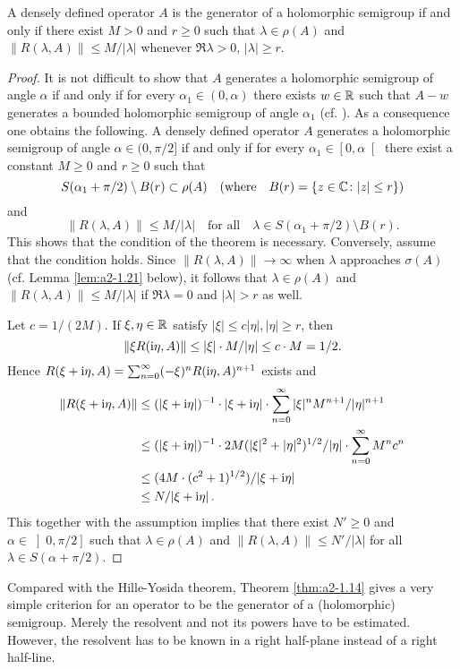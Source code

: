 \begin{theorem}\label{thm:a2-1.14}
A densely defined operator $A$ is the generator of a holomorphic semigroup if and only if there exist $M > 0$ and $r \geq 0$ such that $\lambda \in \rho(A)$ and $\|R(\lambda,A)\| \leq M/|\lambda|$ whenever $\Re\lambda > 0$, $|\lambda| \geq r$.
\end{theorem}
\begin{proof}
It is not difficult to show that $A$ generates a holomorphic semigroup of angle $\alpha$ if and only if for every $\alpha_{1} \in (0,\alpha)$ there exists 
$w \in \mathbb{R}$ such that $A - w$ generates a bounded holomorphic semigroup of angle 
$\alpha_{1}$ (cf. \citet[p.252]{reedsimon:1978}).
As a consequence one obtains the following.
A densely defined operator $A$ generates a holomorphic semigroup of angle $\alpha \in (0,\pi/2]$ if and only if for every $\alpha_{1} \in \left[0,\alpha\right[$ there exist a constant $M \geq 0$ and $r \geq 0$ such that 
\[
S(\alpha_{1} + \pi/2) \setminus B(r) \subset \rho(A) \quad (\text{where} \quad B(r) = \{z \in \mathbb{C} \colon |z| \leq r\})
\]
and
\[
\|R(\lambda,A)\| \leq M/|\lambda|  \quad \text{for all}  \quad \lambda \in S(\alpha_{1}+\pi/2) \setminus B(r).
\]
This shows that the condition of the theorem is necessary.
Conversely, assume that the condition holds.
Since $\|R(\lambda,A)\| \to \infty$ when $\lambda$ approaches $\sigma(A)$ (cf. Lemma  \ref{lem:a2-1.21}   below), 
it follows that $\lambda \in \rho(A)$ and $\|R(\lambda,A)\| \leq M/|\lambda|$ if $\Re\lambda = 0$ and $|\lambda| > r$ as well.

Let $c = 1/(2M)$.
If $\xi, \eta \in \mathbb{R}$ satisfy 
$|\xi| \leq c|\eta|, |\eta| \geq r$, 
then 
\[
\|\xi R(\mathrm{i}\eta,A)\| \leq |\xi| \cdot M/|\eta| \leq c \cdot M = 1/2.
\]
Hence $R(\xi+\mathrm{i}\eta,A) = \sum_{n=0}^\infty (-\xi)^{n}R(\mathrm{i}\eta,A)^{n+1}$ exists and 
\begin{align*}
    \|R(\xi+\mathrm{i}\eta,A)\| &\leq 
    (|\xi + \mathrm{i}\eta|)^{-1} \cdot |\xi + \mathrm{i}\eta| \cdot \sum_{n=0}^\infty |\xi|^{n}M^{n+1}/|\eta|^{n+1}\\
    &\leq  (|\xi + \mathrm{i}\eta|)^{-1} \cdot 2M (|\xi|^{2} + |\eta|^{2})^{1/2} / |\eta| \cdot \sum_{n=0}^\infty M^{n}c^{n}\\   
    &\leq  (4M\cdot(c^{2}+1)^{1/2})/|\xi+\mathrm{i}\eta| \\
    &\leq N/|\xi+\mathrm{i}\eta| \, . 
\end{align*}
This together with the assumption implies that there exist $N' \geq 0$ and $\alpha \in \left]0,\pi/2\right]$ such that $\lambda \in \rho(A)$ and $\|R(\lambda,A)\| \leq N'/|\lambda|$ for all $\lambda \in S(\alpha+\pi/2)$.
\end{proof}
Compared with the Hille-Yosida theorem, Theorem \ref{thm:a2-1.14}   gives a very simple criterion for an operator to be the generator of a (holomorphic) semigroup.
Merely the resolvent and not its powers have to be
estimated.
However, the resolvent has to be known in a right half-plane instead of a right half-line.

